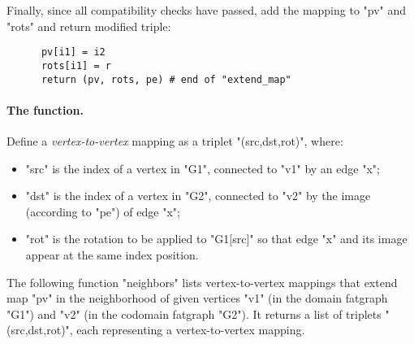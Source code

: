 Finally, since all compatibility checks have passed, add the mapping
to "pv" and "rots" and return modified triple:
\begin{lstlisting}
      pv[i1] = i2
      rots[i1] = r
      return (pv, rots, pe) # end of "extend_map"

\end{lstlisting}

\paragraph{The  function.}
\begin{definition}
  Define a \emph{vertex-to-vertex} mapping as a triplet
  "(src,dst,rot)", where:
  \begin{itemize}
  \item "src" is the index of a vertex in "G1", connected to "v1" by
    an edge "x";
  \item "dst" is the index of a vertex in "G2", connected to "v2" by
    the image (according to "pe") of edge "x";
  \item "rot" is the rotation to be applied to "G1[src]" so that edge
    "x" and its image appear at the same index position.
  \end{itemize}
\end{definition}

The following function "neighbors" lists vertex-to-vertex mappings
that extend map "pv" in the neighborhood of given vertices "v1" (in
the domain fatgraph "G1") and "v2" (in the codomain fatgraph "G2").
It returns a list of triplets "(src,dst,rot)", each representing a
vertex-to-vertex mapping.

